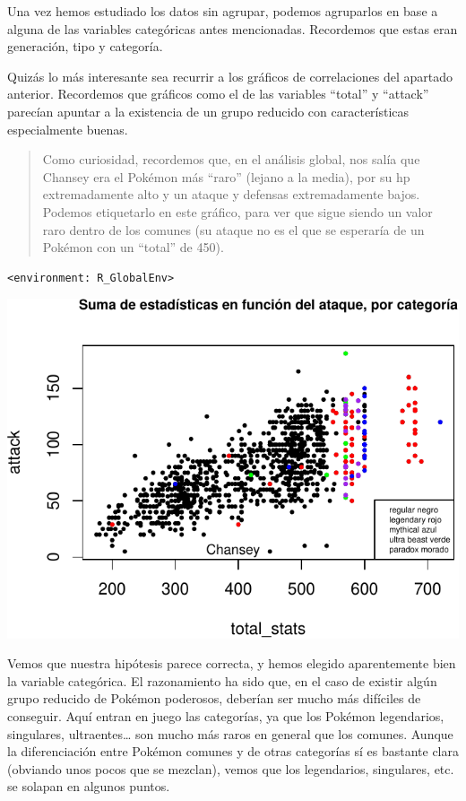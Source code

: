 \documentclass[
  12pt,
]{extreport}
\begin{document}
Una vez hemos estudiado los datos sin agrupar, podemos agruparlos en
base a alguna de las variables categóricas antes mencionadas. Recordemos
que estas eran generación, tipo y categoría.

Quizás lo más interesante sea recurrir a los gráficos de correlaciones
del apartado anterior. Recordemos que gráficos como el de las variables
``total'' y ``attack'' parecían apuntar a la existencia de un grupo
reducido con características especialmente buenas.

\begin{quote}
Como curiosidad, recordemos que, en el análisis global, nos salía que
Chansey era el Pokémon más ``raro'' (lejano a la media), por su hp
extremadamente alto y un ataque y defensas extremadamente bajos. Podemos
etiquetarlo en este gráfico, para ver que sigue siendo un valor raro
dentro de los comunes (su ataque no es el que se esperaría de un Pokémon
con un ``total'' de 450).
\end{quote}

\begin{verbatim}
<environment: R_GlobalEnv>
\end{verbatim}

\begin{center}
\includegraphics{trabajo_files/figure-pdf/unnamed-chunk-16-1.pdf}
\end{center}

Vemos que nuestra hipótesis parece correcta, y hemos elegido
aparentemente bien la variable categórica. El razonamiento ha sido que,
en el caso de existir algún grupo reducido de Pokémon poderosos,
deberían ser mucho más difíciles de conseguir. Aquí entran en juego las
categorías, ya que los Pokémon legendarios, singulares,
ultraentes\ldots{} son mucho más raros en general que los comunes.
Aunque la diferenciación entre Pokémon comunes y de otras categorías sí
es bastante clara (obviando unos pocos que se mezclan), vemos que los
legendarios, singulares, etc. se solapan en algunos puntos.
\end{document}
